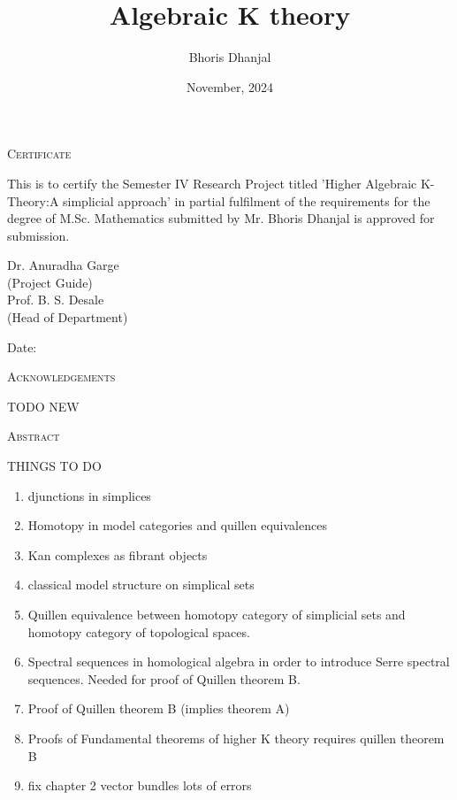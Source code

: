 \documentclass[12pt]{report}
\title{Algebraic K theory}
\author{Bhoris Dhanjal}
\date{November, 2024}
\makeatletter
\numberwithin{equation}{section}
\newcommand\frontmatter{%
	\cleardoublepage
	\@mainmatterfalse
	\pagenumbering{roman}}
\newcommand\mainmatter{%
	\cleardoublepage
	 \@mainmattertrue
	\pagenumbering{arabic}}
\makeatother
\begin{document}
	

	\frontmatter
	
	\begin{center}
		

		{\LARGE {\textsc{Certificate}}}\\[2.5cm]
	\end{center}
	\normalsize This is to certify the Semester IV Research Project titled 'Higher Algebraic K-Theory:A simplicial approach' in partial fulfilment of the requirements for the degree of M.Sc. Mathematics  submitted by Mr. Bhoris Dhanjal is approved for submission.
	

	
	\vfill
	
	
	\begin{flushright}
		Dr. Anuradha Garge\\
		(Project Guide)\\[1.5cm]
		Prof. B. S. Desale\\
		(Head of Department)\\
	\end{flushright}
	
	\begin{flushleft}
		Date:
	\end{flushleft}
	\clearpage
	
	\begin{center}
	
	
	{\LARGE {\textsc{Acknowledgements}}}\\[1cm]
\end{center}
TODO NEW
	\clearpage
	\begin{center}
		
		
		{\LARGE {\textsc{Abstract}}}\\[1cm]
	\end{center}
	THINGS TO DO	
\begin{enumerate}
	\item djunctions in simplices
	\item Homotopy in model categories and quillen equivalences 
	\item Kan complexes as fibrant objects
	\item classical model structure on simplical sets
	\item Quillen equivalence between homotopy category of simplicial sets and homotopy category of topological spaces.
	\item Spectral sequences in homological algebra in order to introduce Serre spectral sequences. Needed for proof of Quillen theorem B.
	\item Proof of Quillen theorem B (implies theorem A)
	\item Proofs of Fundamental theorems of higher K theory requires quillen theorem B
	\item fix chapter 2 vector bundles lots of errors
\end{enumerate}
\clearpage
	\tableofcontents
	\mainmatter
\end{document}
